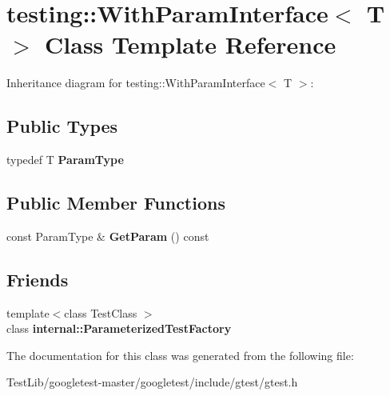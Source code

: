 \hypertarget{classtesting_1_1WithParamInterface}{}\section{testing\+:\+:With\+Param\+Interface$<$ T $>$ Class Template Reference}
\label{classtesting_1_1WithParamInterface}


Inheritance diagram for testing\+:\+:With\+Param\+Interface$<$ T $>$\+:
\subsection*{Public Types}
\begin{DoxyCompactItemize}
\item 
\mbox{\label{classtesting_1_1WithParamInterface_a343febaaebf1f025bda484f841d4fec1}} 
typedef T {\bfseries Param\+Type}
\end{DoxyCompactItemize}
\subsection*{Public Member Functions}
\begin{DoxyCompactItemize}
\item 
\mbox{\label{classtesting_1_1WithParamInterface_aa7b9028f06ee7ec1174bb25317b07eb2}} 
const Param\+Type \& {\bfseries Get\+Param} () const
\end{DoxyCompactItemize}
\subsection*{Friends}
\begin{DoxyCompactItemize}
\item 
\mbox{\label{classtesting_1_1WithParamInterface_a7543eb7df89f00fff517dba24bc11dd5}} 
{\footnotesize template$<$class Test\+Class $>$ }\\class {\bfseries internal\+::\+Parameterized\+Test\+Factory}
\end{DoxyCompactItemize}


The documentation for this class was generated from the following file\+:\begin{DoxyCompactItemize}
\item 
Test\+Lib/googletest-\/master/googletest/include/gtest/gtest.\+h\end{DoxyCompactItemize}
